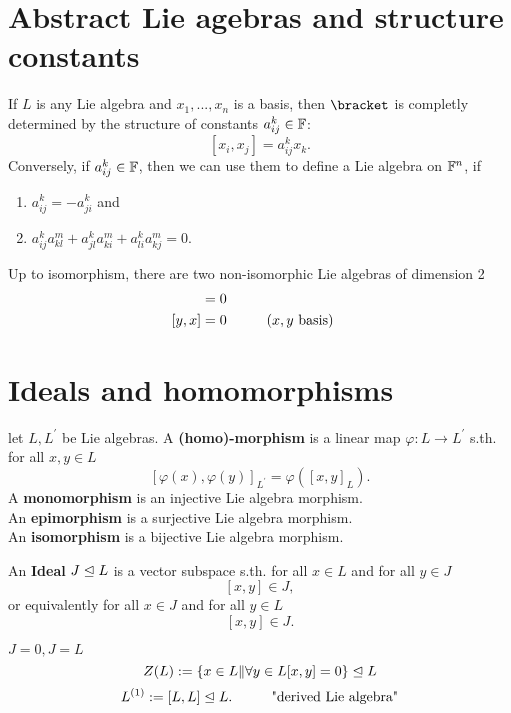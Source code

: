 \section{Abstract Lie agebras and structure constants}
If $L$ is any Lie algebra and $x_1,...,x_n$ is a basis, 
then $\bracket$ is  completly determined by the structure of constants $a_{ij}^k \in \mathbb{F}$:
$$ [x_i,x_j] = a_{ij}^k x_k .$$
Conversely, if $a_{ij}^k \in \mathbb{F}$, then we can use them to define a Lie algebra on $\mathbb{F}^n$, if
\begin{enumerate}[label=(\arabic*)]
    \item $a_{ij}^k = -a_{ji}^k$ and
    \item $a_{ij}^k a_{kl}^m + a_{jl}^k a_{ki}^m + a_{li}^k a_{kj}^m = 0$.
\end{enumerate}

\begin{example}
    Up to isomorphism, there are two non-isomorphic Lie algebras of dimension 2
    \begin{align*}
        [x,y] = 0\\
        [y,x] = 0 &\tab (x,y \text{ basis})
    \end{align*}
\end{example}

\section{Ideals and homomorphisms}
\begin{definition}
    let $L,L^{'}$ be Lie algebras. A \textbf{(homo)-morphism} is a linear map 
    $\varphi : L \to L^{'}$ s.th. for all $x,y \in L$
    $$ [\varphi(x), \varphi(y)]_{L^{'}} = \varphi([x,y]_L). $$
    A \textbf{monomorphism} is an injective Lie algebra morphism.\\ 
    An \textbf{epimorphism} is a surjective Lie algebra morphism.\\
    An \textbf{isomorphism} is a bijective Lie algebra morphism.
\end{definition}

\begin{definition}
    An \textbf{Ideal} $J \trianglelefteq L$ is a vector subspace s.th.
    for all $x \in L$ and for all $y \in J$
    $$ [x,y] \in J ,$$
    or equivalently for all $x \in J$ and for all $y \in L$
    $$ [x,y] \in J.$$ 
\end{definition}

\begin{example}
    $J=0, J=L$
    $$ Z(L) := \{x \in L \| \forall y \in L[x,y] = 0\} \trianglelefteq L $$
    $$ L^{(1)} := [L,L] \trianglelefteq L. \hspace*{1cm} \text{"derived Lie algebra"}$$
\end{example}


